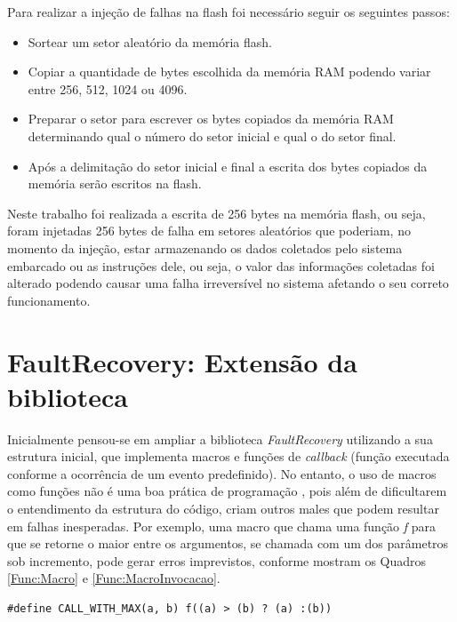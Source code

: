 Para realizar a injeção de falhas na flash foi necessário seguir os seguintes passos:

\begin{itemize}
	\item Sortear um setor aleatório da memória flash.
	
	\item Copiar a quantidade de bytes escolhida da memória RAM podendo variar entre 256, 512, 1024 ou 4096.
	
	\item Preparar o setor para escrever os bytes copiados da memória RAM determinando qual o número do setor inicial e qual o do setor final.
	
	\item Após a delimitação do setor inicial e final a escrita dos bytes copiados da memória serão escritos na flash.
	
\end{itemize}

Neste trabalho foi realizada a escrita de 256 bytes na memória flash, ou seja, foram injetadas 256 bytes de falha em setores aleatórios que poderiam, no momento da injeção, estar armazenando os dados coletados pelo sistema embarcado ou as instruções dele, ou seja, o valor das informações coletadas foi alterado podendo causar uma falha irreversível no sistema afetando o seu correto funcionamento.

\section{FaultRecovery: Extensão da biblioteca} \label{sec:extensaoBiblioteca}

Inicialmente pensou-se em ampliar a biblioteca \textit{FaultRecovery} utilizando a sua estrutura inicial, que implementa macros e funções de \textit{callback} (função executada conforme a ocorrência de um evento predefinido). No entanto, o uso de macros como funções não é uma boa prática de programação \cite{Meyers:2011}, pois além de dificultarem o entendimento da estrutura do código, criam outros males que podem resultar em falhas inesperadas. Por exemplo, uma macro que chama uma função \textit{f} para que se retorne o maior entre os argumentos, se chamada com um dos parâmetros sob incremento, pode gerar erros imprevistos, conforme mostram os Quadros \ref{Func:Macro} e \ref{Func:MacroInvocacao}.

\begin{lstlisting}[label=Func:Macro,caption={[Uso de macro como função] Macro que chama \textit{f} como o máximo entre a e b}]
#define CALL_WITH_MAX(a, b) f((a) > (b) ? (a) :(b))
\end{lstlisting}

